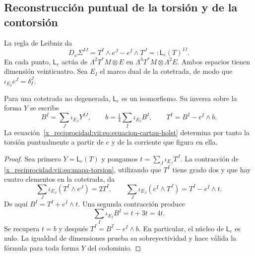 \begin{HMTCompactSection}
\section{Reconstrucción puntual de la torsión y de la contorsión}
\label{x_reciprocidad:vii:subsec:reconstruccion-torsion}

La regla de Leibniz da
\begin{equation}
 D_\omega\Sigma^{IJ}
 =T^I\wedge e^J-e^I\wedge T^J
 =:\mathsf L_e(T)^{IJ}.
 \label{x_reciprocidad:vii:eq:mapa-torsion}
\end{equation}
En cada punto, \(\mathsf L_e\) actúa de
\(\Lambda^2T^*M\otimes E\) en
\(\Lambda^3T^*M\otimes\Lambda^2E\). Ambos espacios tienen dimensión
veinticuatro. Sea \(E_I\) el marco dual de la cotetrada, de modo que
\(\iota_{E_I}e^J=\delta_I^J\).

\begin{theorem}
\label{x_reciprocidad:vii:thm:inversion-torsion}
Para una cotetrada no degenerada, \(\mathsf L_e\) es un isomorfismo.
Su inversa sobre la forma \(Y\) se escribe
\begin{equation}
 B^I=\sum_J\iota_{E_J}Y^{IJ},\qquad
 b=\tfrac14\sum_I\iota_{E_I}B^I,\qquad
 T^I=B^I-e^I\wedge b.
 \label{x_reciprocidad:vii:eq:torsion-explicita}
\end{equation}
La ecuación~\eqref{x_reciprocidad:vii:eq:ecuacion-cartan-holst} determina por tanto
la torsión puntualmente a partir de \(e\) y de la corriente que figura
en ella.
\end{theorem}
\begin{proof}
Sea primero \(Y=\mathsf L_e(T)\) y pongamos
\(t=\sum_J\iota_{E_J}T^J\). La contracción de
\eqref{x_reciprocidad:vii:eq:mapa-torsion}, utilizando que \(T^I\) tiene grado dos
y que hay cuatro elementos en la cotetrada, da
\[
 \sum_J\iota_{E_J}(T^I\wedge e^J)=2T^I,
 \qquad
 \sum_J\iota_{E_J}(e^I\wedge T^J)=T^I-e^I\wedge t.
\]
De aquí \(B^I=T^I+e^I\wedge t\). Una segunda contracción produce
\[
 \sum_I\iota_{E_I}B^I=t+3t=4t.
\]
Se recupera \(t=b\) y después \(T^I=B^I-e^I\wedge b\).
En particular, el núcleo de \(\mathsf L_e\) es nulo. La igualdad
de dimensiones prueba su sobreyectividad y hace válida la fórmula
para toda forma \(Y\) del codominio.
\end{proof}


\end{HMTCompactSection}
